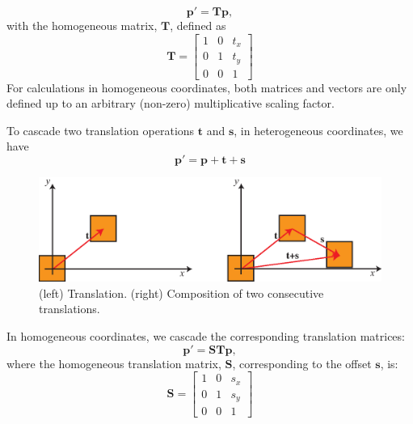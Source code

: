 \begin{equation}
    \mathbf{p}' = \mathbf{T} \mathbf{p},
\end{equation}
with the homogeneous matrix, $\mathbf{T}$, defined as
\begin{equation}
    \mathbf{T} =             
    \begin{bmatrix}
    1 & 0 & t_x \\
    0 & 1 & t_y \\
    0 & 0 & 1
    \end{bmatrix}
\end{equation}
For calculations in homogeneous coordinates, both matrices and vectors are only defined up to an arbitrary (non-zero) multiplicative scaling factor.

To cascade two translation operations $\mathbf{t}$ and  $\mathbf{s} $, in heterogeneous coordinates, we have 
\begin{equation}
     \mathbf{p}' = \mathbf{p} + \mathbf{t}  + \mathbf{s}   
\end{equation}


\begin{figure}[ht]
\centerline{
\includegraphics[width=.7\linewidth]{figures/imaging_geometry/translations.eps}
}
\caption{(left) Translation. (right) Composition of two consecutive translations.}
\label{fig:translations}
\end{figure}


In homogeneous coordinates, we cascade the corresponding translation matrices:
\begin{equation}
     \mathbf{p}' = \mathbf{S} \mathbf{T} \mathbf{p},
\end{equation}
where the homogeneous translation matrix, $\mathbf{S}$, corresponding to the offset $\mathbf{s}$, is:
\begin{equation}
    \mathbf{S} =            
    \begin{bmatrix}
    1 & 0 & s_x \\
    0 & 1 & s_y \\
    0 & 0 & 1
    \end{bmatrix}
\end{equation}

